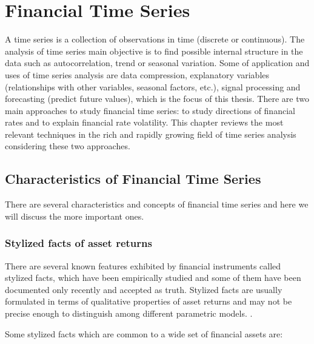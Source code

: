 
\chapter{Financial Time Series}
\label{chapter:FTT}

\vspace{0.5cm} 
 
A time series is a collection of observations in time (discrete or continuous).
The analysis of time series main objective is to find possible internal
structure in the data such as autocorrelation, trend or seasonal variation.
Some of application and uses of time series analysis are data compression,
explanatory variables (relationships with other variables, seasonal factors,
etc.), signal processing and forecasting (predict future values), which is the focus of this thesis. 
There are two main approaches to study financial time series: to study directions of financial
rates and to explain financial rate volatility.  This chapter reviews the most
relevant techniques in the rich and rapidly growing field of time series
analysis considering these two approaches.


\section{Characteristics of Financial Time Series}
There are several characteristics and concepts of financial time series and here we will discuss the more important ones.
\subsection{Stylized facts of asset returns}
\label{sec:stylizedfacts}

There are several known features exhibited by financial instruments called
stylized facts, which have been empirically studied and some of them have been
documented only recently and accepted as truth. Stylized facts are usually
formulated in terms of qualitative properties of asset returns and may not be
precise enough to distinguish among different parametric models.
\cite{cont2001}.

Some stylized facts which are common to a wide set of financial assets
\cite{sewell2011} are:

